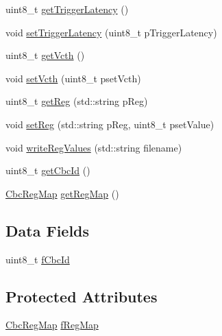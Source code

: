 \begin{DoxyCompactItemize}
\item 
uint8\-\_\-t \hyperlink{class_ph2___hw_description_1_1_cbc_a7dcee2bd6f0cbe1e9342f4d8e4229477}{get\-Trigger\-Latency} ()
\item 
void \hyperlink{class_ph2___hw_description_1_1_cbc_af2ca8a515be91e594345f59765eedc86}{set\-Trigger\-Latency} (uint8\-\_\-t p\-Trigger\-Latency)
\item 
uint8\-\_\-t \hyperlink{class_ph2___hw_description_1_1_cbc_ad52630f4caa9defc0c46e38c7f828d5f}{get\-Vcth} ()
\item 
void \hyperlink{class_ph2___hw_description_1_1_cbc_a055db371622ef5e565d7abd490d1b5bd}{set\-Vcth} (uint8\-\_\-t pset\-Vcth)
\item 
uint8\-\_\-t \hyperlink{class_ph2___hw_description_1_1_cbc_a8e29ea3bf86977585b3824941d948f91}{get\-Reg} (std\-::string p\-Reg)
\item 
void \hyperlink{class_ph2___hw_description_1_1_cbc_aa24292fe56d6b19ec08ba67f9790b5c7}{set\-Reg} (std\-::string p\-Reg, uint8\-\_\-t pset\-Value)
\item 
void \hyperlink{class_ph2___hw_description_1_1_cbc_a21a95937ae871d154b4d0f7f2fe6bd02}{write\-Reg\-Values} (std\-::string filename)
\item 
uint8\-\_\-t \hyperlink{class_ph2___hw_description_1_1_cbc_a14a78f27fb0e6c74622b6bc49259a2f3}{get\-Cbc\-Id} ()
\item 
\hyperlink{namespace_ph2___hw_description_a9a23b373068f169aa67ca1d22c9a6001}{Cbc\-Reg\-Map} \hyperlink{class_ph2___hw_description_1_1_cbc_ad2bae647b2474b4737d7f2ede5a73ed3}{get\-Reg\-Map} ()
\end{DoxyCompactItemize}
\subsection*{Data Fields}
\begin{DoxyCompactItemize}
\item 
uint8\-\_\-t \hyperlink{class_ph2___hw_description_1_1_cbc_a99b392306d4cdb7ffa7f956fc553011c}{f\-Cbc\-Id}
\end{DoxyCompactItemize}
\subsection*{Protected Attributes}
\begin{DoxyCompactItemize}
\item 
\hyperlink{namespace_ph2___hw_description_a9a23b373068f169aa67ca1d22c9a6001}{Cbc\-Reg\-Map} \hyperlink{class_ph2___hw_description_1_1_cbc_ab4dbf1af172e821d95f77acb7e4fb962}{f\-Reg\-Map}
\end{DoxyCompactItemize}


